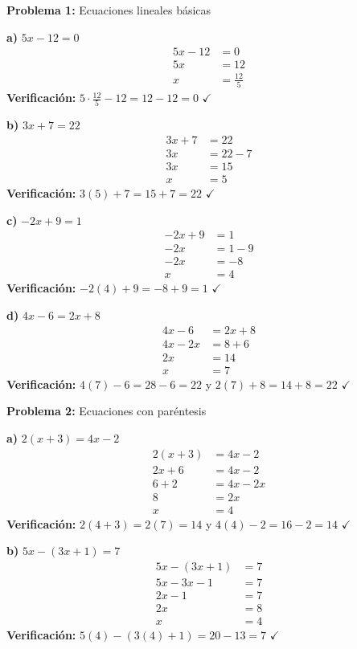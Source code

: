 \textbf{Problema 1:} Ecuaciones lineales básicas

\textbf{a)} $5x - 12 = 0$
\begin{align}
5x - 12 &= 0\\
5x &= 12\\
x &= \frac{12}{5}
\end{align}
\textbf{Verificación:} $5 \cdot \frac{12}{5} - 12 = 12 - 12 = 0$ $\checkmark$

\textbf{b)} $3x + 7 = 22$
\begin{align}
3x + 7 &= 22\\
3x &= 22 - 7\\
3x &= 15\\
x &= 5
\end{align}
\textbf{Verificación:} $3(5) + 7 = 15 + 7 = 22$ $\checkmark$

\textbf{c)} $-2x + 9 = 1$
\begin{align}
-2x + 9 &= 1\\
-2x &= 1 - 9\\
-2x &= -8\\
x &= 4
\end{align}
\textbf{Verificación:} $-2(4) + 9 = -8 + 9 = 1$ $\checkmark$

\textbf{d)} $4x - 6 = 2x + 8$
\begin{align}
4x - 6 &= 2x + 8\\
4x - 2x &= 8 + 6\\
2x &= 14\\
x &= 7
\end{align}
\textbf{Verificación:} $4(7) - 6 = 28 - 6 = 22$ y $2(7) + 8 = 14 + 8 = 22$ $\checkmark$

\textbf{Problema 2:} Ecuaciones con paréntesis

\textbf{a)} $2(x + 3) = 4x - 2$
\begin{align}
2(x + 3) &= 4x - 2\\
2x + 6 &= 4x - 2\\
6 + 2 &= 4x - 2x\\
8 &= 2x\\
x &= 4
\end{align}
\textbf{Verificación:} $2(4 + 3) = 2(7) = 14$ y $4(4) - 2 = 16 - 2 = 14$ $\checkmark$

\textbf{b)} $5x - (3x + 1) = 7$
\begin{align}
5x - (3x + 1) &= 7\\
5x - 3x - 1 &= 7\\
2x - 1 &= 7\\
2x &= 8\\
x &= 4
\end{align}
\textbf{Verificación:} $5(4) - (3(4) + 1) = 20 - 13 = 7$ $\checkmark$

